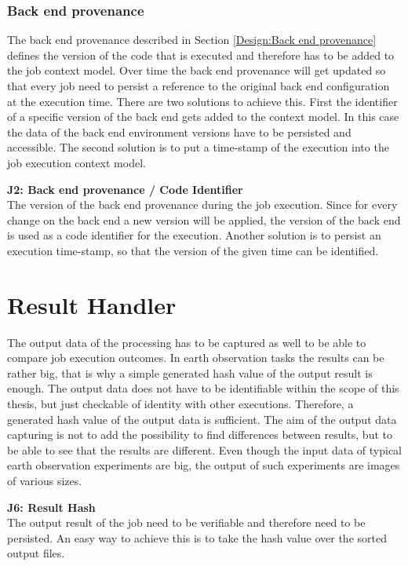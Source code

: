 \documentclass[draft,final]{vutinfth} %
\begin{document}
\subsubsection{Back end provenance}\label{Job:Back end provenance}
The back end provenance described in Section \ref{Design:Back end provenance} defines the version of the code that is executed and therefore has to be added to the job context model. Over time the back end provenance will get updated so that every job need to persist a reference to the original back end configuration at the execution time. There are two solutions to achieve this. First the identifier of a specific version of the back end gets added to the context model. In this case the data of the back end environment versions have to be persisted and accessible. The second solution is to put a time-stamp of the execution into the job execution context model.

\textbf{J2: Back end provenance / Code Identifier} \\
The version of the back end provenance during the job execution. Since for every change on the back end a new version will be applied, the version of the back end is used as a code identifier for the execution. Another solution is to persist an execution time-stamp, so that the version of the given time can be identified.


\section{Result Handler}\label{Design:Result Handler}
The output data of the processing has to be captured as well to be able to compare job execution outcomes. In earth observation tasks the results can be rather big, that is why a simple generated hash value of the output result is enough. The output data does not have to be identifiable within the scope of this thesis, but just checkable of identity with other executions. Therefore, a generated hash value of the output data is sufficient. The aim of the output data capturing is not to add the possibility to find differences between results, but to be able to see that the results are different. Even though the input data of typical earth observation experiments are big, the output of such experiments are images of various sizes.   

\textbf{J6: Result Hash} \\
The output result of the job need to be verifiable and therefore need to be persisted. An easy way to achieve this is to take the hash value over the sorted output files.
 
\end{document}
